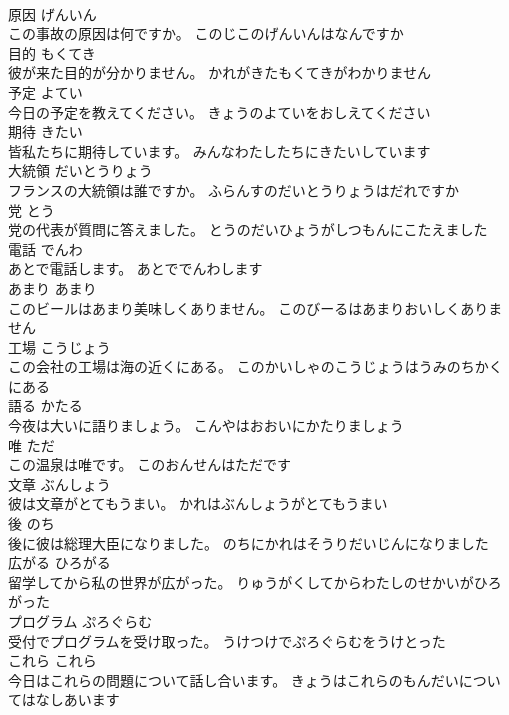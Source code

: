 \documentclass[8pt]{extreport}
\begin{document}
\begin{CJK}{UTF8}{min}
\\	原因	げんいん	
\\	この事故の原因は何ですか。	このじこのげんいんはなんですか	
\\	目的	もくてき	
\\	彼が来た目的が分かりません。	かれがきたもくてきがわかりません	
\\	予定	よてい	
\\	今日の予定を教えてください。	きょうのよていをおしえてください	
\\	期待	きたい	
\\	皆私たちに期待しています。	みんなわたしたちにきたいしています	
\\	大統領	だいとうりょう	
\\	フランスの大統領は誰ですか。	ふらんすのだいとうりょうはだれですか	
\\	党	とう	
\\	党の代表が質問に答えました。	とうのだいひょうがしつもんにこたえました	
\\	電話	でんわ	
\\	あとで電話します。	あとででんわします	
\\	あまり	あまり	
\\	このビールはあまり美味しくありません。	このびーるはあまりおいしくありません	
\\	工場	こうじょう	
\\	この会社の工場は海の近くにある。	このかいしゃのこうじょうはうみのちかくにある	
\\	語る	かたる	
\\	今夜は大いに語りましょう。	こんやはおおいにかたりましょう	
\\	唯	ただ	
\\	この温泉は唯です。	このおんせんはただです	
\\	文章	ぶんしょう	
\\	彼は文章がとてもうまい。	かれはぶんしょうがとてもうまい	
\\	後	のち	
\\	後に彼は総理大臣になりました。	のちにかれはそうりだいじんになりました	
\\	広がる	ひろがる	
\\	留学してから私の世界が広がった。	りゅうがくしてからわたしのせかいがひろがった	
\\	プログラム	ぷろぐらむ	
\\	受付でプログラムを受け取った。	うけつけでぷろぐらむをうけとった	
\\	これら	これら	
\\	今日はこれらの問題について話し合います。	きょうはこれらのもんだいについてはなしあいます	

\end{CJK}
\end{document}
